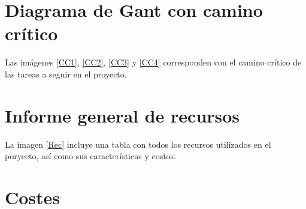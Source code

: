 \documentclass[11pt,a4paper,spanish,twoside]{book}
\begin{document}
\begin{sidewaystable}
\end{sidewaystable}

\begin{sidewaystable}
\end{sidewaystable}

\begin{sidewaystable}
\end{sidewaystable}

\section{Diagrama de Gant con camino crítico}

Las imágenes \ref{CC1}, \ref{CC2}, \ref{CC3} y \ref{CC4} corresponden con el
camino crítico de las tareas a seguir en el proyecto.

\begin{sidewaystable}
\end{sidewaystable}

\begin{sidewaystable}
\end{sidewaystable}

\begin{sidewaystable}
\end{sidewaystable}

\begin{sidewaystable}
\end{sidewaystable}

\section{Informe general de recursos}
La imagen \ref{Rec} incluye una tabla con todos los recursos utilizados en el
poryecto, así como sus características y costos.
\begin{sidewaystable}
\end{sidewaystable}
\section{Costes}
\end{document}
